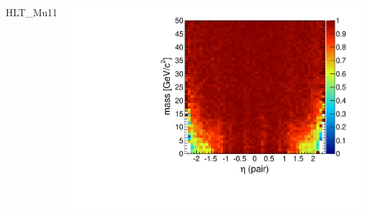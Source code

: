 \documentclass[compress]{beamer}
\begin{document}
\begin{frame}
\begin{columns}
\centering HLT\_Mu11

\includegraphics[width=\linewidth]{masseta_pluscut_Mu11.pdf}
\end{columns}
\end{frame}

\end{document}
